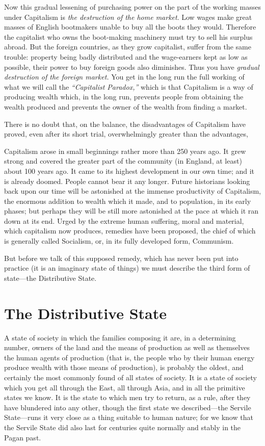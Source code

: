 \documentclass{book}
\begin{document}
Now this gradual lessening of purchasing power on the part of the working masses under Capitalism is \emph{the destruction of the home market}. Low wages make great masses of English bootmakers unable to buy all the boots they would. Therefore the capitalist who owns the boot-making machinery must try to sell his surplus abroad. But the foreign countries, as they grow capitalist, suffer from the same trouble: property being badly distributed and the wage-earners kept as low as possible, their power to buy foreign goods also diminishes. Thus you have \emph{gradual destruction of the foreign market.} You get in the long run the full working of what we will call the \emph{“Capitalist Paradox,”} which is that Capitalism is a way of producing wealth which, in the long run, prevents people from obtaining the wealth produced and prevents the owner of the wealth from finding a market.

There is no doubt that, on the balance, the disadvantages of Capitalism have proved, even after its short trial, overwhelmingly greater than the advantages,

Capitalism arose in small beginnings rather more than 250 years ago. It grew strong and covered the greater part of the community (in England, at least) about 100 years ago. It came to its highest development in our own time; and it is already doomed. People cannot bear it any longer. Future historians looking back upon our time will be astonished at the immense productivity of Capitalism, the enormous addition to wealth which it made, and to population, in its early phases; but perhaps they will be still more astonished at the pace at which it ran down at its end. Urged by the extreme human suffering, moral and material, which capitalism now produces, remedies have been proposed, the chief of which is generally called Socialism, or, in its fully developed form, Communism.

But before we talk of this supposed remedy, which has never been put into practice (it is an imaginary state of things) we must describe the third form of state—the Distributive State.

\chapter*{The Distributive State}
\label{chapter-13}
A state of society in which the families composing it are, in a determining number, owners of the land and the means of production as well as themselves the human agents of production (that is, the people who by their human energy produce wealth with those means of production), is probably the oldest, and certainly the most commonly found of all states of society. It is a state of society which you get all through the East, all through Asia, and in all the primitive states we know. It is the state to which men try to return, as a rule, after they have blundered into any other, though the first state we described—the Servile State—runs it very close as a thing suitable to human nature; for we know that the Servile State did also last for centuries quite normally and stably in the Pagan past.
\end{document}
